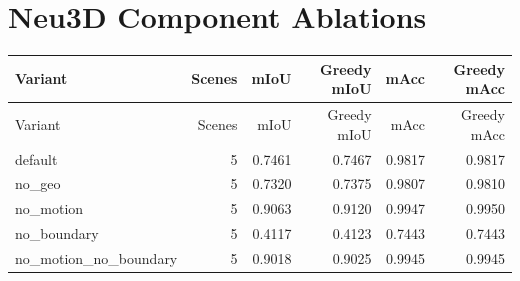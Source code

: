 \documentclass[10pt]{article}
\begin{document}
\section{Neu3D Component Ablations}
\small
\begin{longtable}{lrrrrr}
\toprule
Variant & Scenes & mIoU & Greedy mIoU & mAcc & Greedy mAcc \\
\midrule
\endfirsthead
\toprule
Variant & Scenes & mIoU & Greedy mIoU & mAcc & Greedy mAcc \\
\midrule
\endhead
default & 5 & 0.7461 & 0.7467 & 0.9817 & 0.9817 \\
no\_geo & 5 & 0.7320 & 0.7375 & 0.9807 & 0.9810 \\
no\_motion & 5 & 0.9063 & 0.9120 & 0.9947 & 0.9950 \\
no\_boundary & 5 & 0.4117 & 0.4123 & 0.7443 & 0.7443 \\
no\_motion\_no\_boundary & 5 & 0.9018 & 0.9025 & 0.9945 & 0.9945 \\
\bottomrule
\end{longtable}
\normalsize
\end{document}
